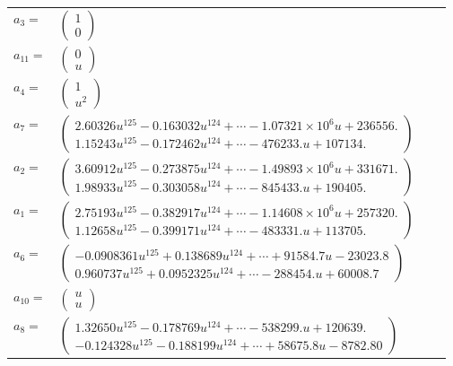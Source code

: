 \documentclass[1p]{elsarticle_modified}
\theoremstyle{definition}
\begin{document}
\begin{tabular}{m{7pt} m{180pt} m{7pt} m{180pt} }
\flushright $a_{3}=$&$\begin{pmatrix}1\\0\end{pmatrix}$ \\
\flushright $a_{11}=$&$\begin{pmatrix}0\\u\end{pmatrix}$ \\
\flushright $a_{4}=$&$\begin{pmatrix}1\\u^2\end{pmatrix}$ \\
\flushright $a_{7}=$&$\begin{pmatrix}2.60326 u^{125}-0.163032 u^{124}+\cdots-1.07321\times10^{6} u+236556.\\1.15243 u^{125}-0.172462 u^{124}+\cdots-476233. u+107134.\end{pmatrix}$ \\
\flushright $a_{2}=$&$\begin{pmatrix}3.60912 u^{125}-0.273875 u^{124}+\cdots-1.49893\times10^{6} u+331671.\\1.98933 u^{125}-0.303058 u^{124}+\cdots-845433. u+190405.\end{pmatrix}$ \\
\flushright $a_{1}=$&$\begin{pmatrix}2.75193 u^{125}-0.382917 u^{124}+\cdots-1.14608\times10^{6} u+257320.\\1.12658 u^{125}-0.399171 u^{124}+\cdots-483331. u+113705.\end{pmatrix}$ \\
\flushright $a_{6}=$&$\begin{pmatrix}-0.0908361 u^{125}+0.138689 u^{124}+\cdots+91584.7 u-23023.8\\0.960737 u^{125}+0.0952325 u^{124}+\cdots-288454. u+60008.7\end{pmatrix}$ \\
\flushright $a_{10}=$&$\begin{pmatrix}u\\u\end{pmatrix}$ \\
\flushright $a_{8}=$&$\begin{pmatrix}1.32650 u^{125}-0.178769 u^{124}+\cdots-538299. u+120639.\\-0.124328 u^{125}-0.188199 u^{124}+\cdots+58675.8 u-8782.80\end{pmatrix}$ \\

\end{tabular}
\end{document}
